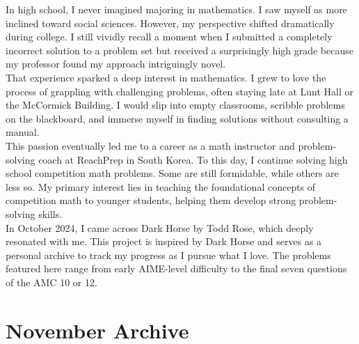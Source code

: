 \documentclass[12pt]{article}
\begin{document}
\begin{flushleft}
In high school, I never imagined majoring in mathematics. I saw myself as more inclined toward social sciences. However, my perspective shifted dramatically during college. I still vividly recall a moment when I submitted a completely incorrect solution to a problem set but received a surprisingly high grade because my professor found my approach intriguingly novel.\\
\bigskip
That experience sparked a deep interest in mathematics. I grew to love the process of grappling with challenging problems, often staying late at Lunt Hall or the McCormick Building. I would slip into empty classrooms, scribble problems on the blackboard, and immerse myself in finding solutions without consulting a manual.\\
\bigskip
This passion eventually led me to a career as a math instructor and problem-solving coach at ReachPrep in South Korea. To this day, I continue solving high school competition math problems. Some are still formidable, while others are less so. My primary interest lies in teaching the foundational concepts of competition math to younger students, helping them develop strong problem-solving skills.\\
\bigskip
In October 2024, I came across Dark Horse by Todd Rose, which deeply resonated with me. This project is inspired by Dark Horse and serves as a personal archive to track my progress as I pursue what I love. The problems featured here range from early AIME-level difficulty to the final seven questions of the AMC 10 or 12.\\
\newpage


\section*{November Archive}




\end{flushleft}
\end{document}
